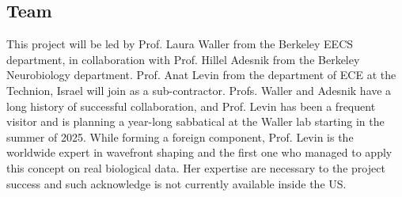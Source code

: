 \subsection{Team}
This project will be led by Prof. Laura Waller from the Berkeley EECS department, in collaboration with Prof. Hillel Adesnik from the Berkeley Neurobiology department. Prof. Anat Levin from the department of ECE at the Technion, Israel will join as a sub-contractor. Profs. Waller and Adesnik have a long history of successful collaboration, and Prof. Levin has been a frequent visitor and is planning a year-long sabbatical at the Waller lab starting in the summer of 2025.
While forming a foreign component, Prof. Levin is the worldwide expert in wavefront shaping and the first one who managed to apply this concept on real biological data. Her expertise are necessary to the project success and such acknowledge is not currently available inside the US.    